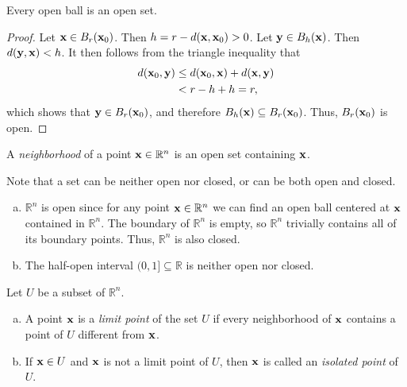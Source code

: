 \documentclass[12pt,letterpaper,reqno]{article}
\numberwithin{equation}{section}
\newcommand{\R}{\ensuremath{\mathbb R}}
\newcommand{\bx}{{\bf x}}
\newcommand{\by}{{\bf y}}
\begin{document}
{\begin{example}
Every open ball is an open set.	
\end{example}

\begin{proof}
	Let $\bx \in B_r(\bx_0)$. Then $h=r-d(\bx,\bx_0)>0$. Let $\by \in B_h(\bx)$. Then $d(\by,\bx)<h$. It then follows from the triangle inequality that
	\begin{align*}
		d(\bx_0,\by) &\leq d(\bx_0,\bx)+d(\bx,\by) \\
		&<r-h+h=r,
	\end{align*}
	which shows that $\by \in B_r(\bx_0)$, and therefore $B_h(\bx) \subseteq B_r(\bx_0)$. Thus, $B_r(\bx_0)$ is open.
\end{proof}

\begin{defn}[Neighborhood]
	A \emph{neighborhood} of a point $\bx \in \R^n$ is an open set containing $\bx$.
\end{defn}



\begin{remark}
Note that a set can be neither open nor closed, or can be both open and closed.	
\end{remark}

\begin{example}
\begin{enumerate}[(a)]
	\item $\R^n$ is open since for any point $\bx \in \R^n$ we can find an open ball centered at $\bx$ contained in $\R^n$. The boundary of $\R^n$ is empty, so $\R^n$ trivially contains all of its boundary points. Thus, $\R^n$ is also closed. 
	\item The half-open interval $(0,1] \subseteq \R$ is neither open nor closed.
\end{enumerate}	
\end{example}

\begin{defn}
	Let $U$ be a subset of $\R^n$.
	\begin{enumerate}[(a)]
		\item A point $\bx$ is a \emph{limit point} of the set $U$ if every neighborhood of $\bx$ contains a point of $U$ different from $\bx$.
		\item If $\bx \in U$ and $\bx$ is not a limit point of $U$, then $\bx$ is called an \emph{isolated point} of $U$.
	\end{enumerate}
\end{defn}

}
\end{document}
